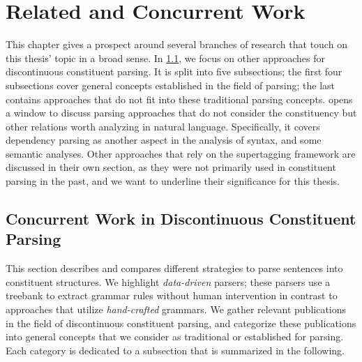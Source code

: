 \documentclass[../document.tex]{subfiles}
\begin{document}
    \chapter{Related and Concurrent Work}\label{sec:literature}
    This chapter gives a prospect around several branches of research that touch on this thesis' topic in a broad sense.
    In \cref{sec:literature:constituency}, we focus on other approaches for discontinuous constituent parsing.
    It is split into five subsections; the first four subsections cover general concepts established in the field of parsing; the last contains approaches that do not fit into these traditional parsing concepts.
     opens a window to discuss parsing approaches that do not consider the constituency but other relations worth analyzing in natural language.
    Specifically, it covers dependency parsing as another aspect in the analysis of syntax, and some semantic analyses.
    Other approaches that rely on the supertagging framework are discussed in their own section, as they were not primarily used in constituent parsing in the past, and we want to underline their significance for this thesis.

    \section{Concurrent Work in Discontinuous Constituent Parsing}\label{sec:literature:constituency}
    This section describes and compares different strategies to parse sentences into constituent structures.
    We highlight \emph{data-driven} parsers; these parsers use a treebank to extract grammar rules without human intervention \citep[cf.\@][Section~1.1]{Kal10} in contrast to approaches that utilize \emph{hand-crafted} grammars.
    We gather relevant publications in the field of discontinuous constituent parsing, and categorize these publications into general concepts that we consider as traditional or established for parsing.
    Each category is dedicated to a subsection that is summarized in the following.
\end{document}
